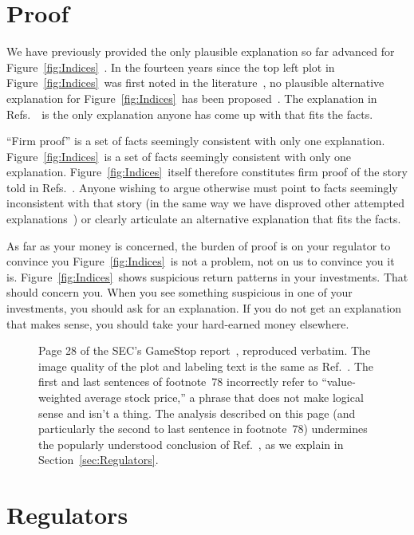 \documentclass[twocolumn,twoside,prd,floatfix,letterpaper]{revtex4}
\def \FigMain {Figure~\ref{fig:Indices}}
\def \theExplanation {\cite{knuteson2016,knuteson2018,knuteson2019}}
\def \RefsTheExplanation {Refs.~\theExplanation}
\begin{document}
\section{Proof}

We have previously provided the only plausible explanation so far advanced for \FigMain~\theExplanation.  In the fourteen years since the top left plot in \FigMain\ was first noted in the literature~\cite{cooper2008return}, no plausible alternative explanation for \FigMain\ has been proposed~\cite{knuteson2020,knuteson2021}.  The explanation in \RefsTheExplanation\ is the only explanation anyone has come up with that fits the facts.

``Firm proof'' is a set of facts seemingly consistent with only one explanation.  \FigMain\ is a set of facts seemingly consistent with only one explanation.  \FigMain\ itself therefore constitutes firm proof of the story told in \RefsTheExplanation.  Anyone wishing to argue otherwise must point to facts seemingly inconsistent with that story (in the same way we have disproved other attempted explanations~\cite{knuteson2020}) or clearly articulate an alternative explanation that fits the facts.

As far as your money is concerned, the burden of proof is on your regulator to convince you \FigMain\ is not a problem, not on us to convince you it is.  \FigMain\ shows suspicious return patterns in your investments.  That should concern you.  When you see something suspicious in one of your investments, you should ask for an explanation.  If you do not get an explanation that makes sense, you should take your hard-earned money elsewhere.

\begin{figure*}[tp]
\caption{\label{fig:SECGameStopReport}Page 28 of the SEC's GameStop report~\cite{SECGameStopReport}, reproduced verbatim.  The image quality of the plot and labeling text is the same as Ref.~\cite{SECGameStopReport}.  The first and last sentences of footnote~78 incorrectly refer to ``value-weighted average stock price,'' a phrase that does not make logical sense and isn't a thing.  The analysis described on this page (and particularly the second to last sentence in footnote~78) undermines the popularly understood conclusion of Ref.~\cite{SECGameStopReport}, as we explain in Section~\ref{sec:Regulators}.}
\end{figure*}


\section{Regulators\label{sec:Regulators}}
\end{document}
